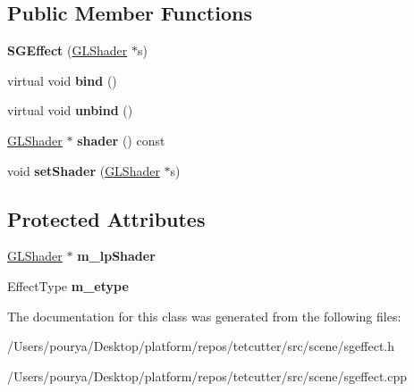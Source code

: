 \subsection*{Public Member Functions}
\begin{DoxyCompactItemize}
\item 
\hypertarget{classps_1_1scene_1_1SGEffect_a4ffe6c1802d21dbef4b2f8fff85c1897}{}{\bfseries S\+G\+Effect} (\hyperlink{classps_1_1opengl_1_1GLShader}{G\+L\+Shader} $\ast$s)\label{classps_1_1scene_1_1SGEffect_a4ffe6c1802d21dbef4b2f8fff85c1897}

\item 
\hypertarget{classps_1_1scene_1_1SGEffect_a912b62d95007fe4417ef0fb3b9a31733}{}virtual void {\bfseries bind} ()\label{classps_1_1scene_1_1SGEffect_a912b62d95007fe4417ef0fb3b9a31733}

\item 
\hypertarget{classps_1_1scene_1_1SGEffect_ac6dd6ec83a77843c4352955bdfa540eb}{}virtual void {\bfseries unbind} ()\label{classps_1_1scene_1_1SGEffect_ac6dd6ec83a77843c4352955bdfa540eb}

\item 
\hypertarget{classps_1_1scene_1_1SGEffect_a7a4fd2356132d434a6f1d0413bd59d15}{}\hyperlink{classps_1_1opengl_1_1GLShader}{G\+L\+Shader} $\ast$ {\bfseries shader} () const \label{classps_1_1scene_1_1SGEffect_a7a4fd2356132d434a6f1d0413bd59d15}

\item 
\hypertarget{classps_1_1scene_1_1SGEffect_abccb3ebbb2424f50c369077dcd46e73c}{}void {\bfseries set\+Shader} (\hyperlink{classps_1_1opengl_1_1GLShader}{G\+L\+Shader} $\ast$s)\label{classps_1_1scene_1_1SGEffect_abccb3ebbb2424f50c369077dcd46e73c}

\end{DoxyCompactItemize}
\subsection*{Protected Attributes}
\begin{DoxyCompactItemize}
\item 
\hypertarget{classps_1_1scene_1_1SGEffect_a763d22386f6b6bae55e4e808d9804738}{}\hyperlink{classps_1_1opengl_1_1GLShader}{G\+L\+Shader} $\ast$ {\bfseries m\+\_\+lp\+Shader}\label{classps_1_1scene_1_1SGEffect_a763d22386f6b6bae55e4e808d9804738}

\item 
\hypertarget{classps_1_1scene_1_1SGEffect_ae9f2cc9d8c543ae35661db926e84cc0a}{}Effect\+Type {\bfseries m\+\_\+etype}\label{classps_1_1scene_1_1SGEffect_ae9f2cc9d8c543ae35661db926e84cc0a}

\end{DoxyCompactItemize}


The documentation for this class was generated from the following files\+:\begin{DoxyCompactItemize}
\item 
/\+Users/pourya/\+Desktop/platform/repos/tetcutter/src/scene/sgeffect.\+h\item 
/\+Users/pourya/\+Desktop/platform/repos/tetcutter/src/scene/sgeffect.\+cpp\end{DoxyCompactItemize}
